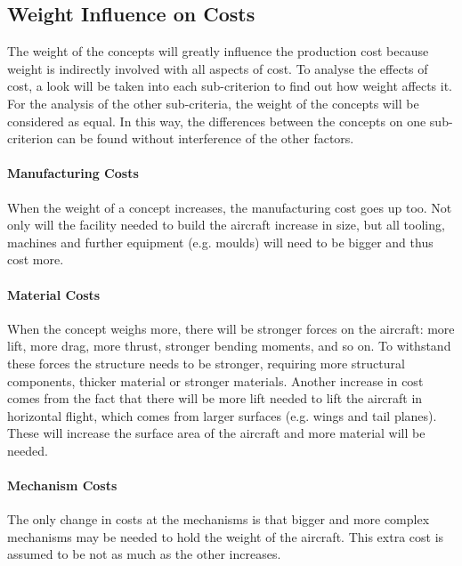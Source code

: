 \subsection{Weight Influence on Costs}
\label{sec:weiginflcost}

The weight of the concepts will greatly influence the production cost because weight is indirectly involved with all aspects of cost. To analyse the effects of cost, a look will be taken into each sub-criterion to find out how weight affects it. For the analysis of the other sub-criteria, the weight of the concepts will be considered as equal. In this way, the differences between the concepts on one sub-criterion can be found without interference of the other factors.

\paragraph{Manufacturing Costs} When the weight of a concept increases, the manufacturing cost goes up too. Not only will the facility needed to build the aircraft increase in size, but all tooling, machines and further equipment (e.g. moulds) will need to be bigger and thus cost more.

\paragraph{Material Costs} When the concept weighs more, there will be stronger forces on the aircraft: more lift, more drag, more thrust, stronger bending moments, and so on. To withstand these forces the structure needs to be stronger, requiring more structural components, thicker material or stronger materials. Another increase in cost comes from the fact that there will be more lift needed to lift the aircraft in horizontal flight, which comes from larger surfaces (e.g. wings and tail planes). These will increase the surface area of the aircraft and more material will be needed.

\paragraph{Mechanism Costs} The only change in costs at the mechanisms is that bigger and more complex mechanisms may be needed to hold the weight of the aircraft. This extra cost is assumed to be not as much as the other increases.

